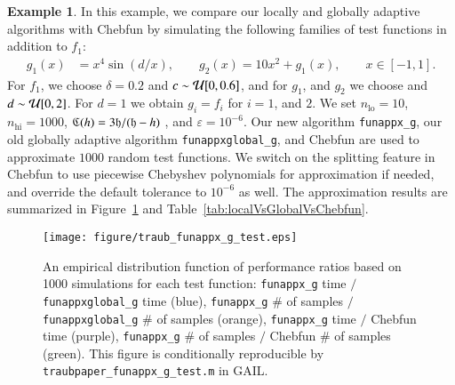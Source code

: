 \documentclass[review]{elsarticle}
\newcommand{\abstol}{\varepsilon}
\theoremstyle{definition}
\newtheorem{exmp}{Example}
\newcommand{\funappxg}{\texttt{funappx\_g}\xspace}
\newcommand{\funappxglobalg}{\texttt{funappxglobal\_g}\xspace}
\begin{document}

\begin{exmp}
In this example, we compare our locally and globally adaptive algorithms with Chebfun by
simulating the following families of test functions  in addition to $f_1$:
%
\begin{align*}
 g_1(x) &= x^4 \sin(d/x), \qquad
 g_2(x) = 10  x^2 + g_1(x), \qquad x \in [-1, 1].
\end{align*}
For $f_1$, we choose $\delta = 0.2$ and $c \sim \mathcal{U}[0,0.6]$, and for $g_1$, and
$g_2$ we choose and $d \sim \mathcal{U}[0,2]$. For $d=1$ we obtain $g_i = f_i$ for
$i=1$, and $2$. We set $n_{\text{lo}} = 10$, $n_{\text{hi}} = 1000$, $\mathfrak{C} (h) =
3 \mathfrak{h}/(\mathfrak{h}-h)$ , and $\abstol = 10^{-6}$. Our new algorithm \texttt{funappx\_g},
our old globally adaptive algorithm \texttt{funappxglobal\_g}, and Chebfun are
used to approximate $1000$ random test functions. We switch on the splitting
feature in Chebfun to use piecewise Chebyshev polynomials for approximation if
needed, and override the default tolerance to $10^{-6}$ as well. The
approximation results are summarized in Figure~\ref{fig:testfunctions} and
Table~\ref{tab:localVsGlobalVsChebfun}.

%
\begin{figure}[tb]
  \centering
\texttt{[image: figure/traub\_funappx\_g\_test.eps]}
\caption{An empirical distribution function of performance ratios based on 1000
simulations for each test function: \funappxg{} time $/$ \funappxglobalg{} time
(blue), \funappxg{} \# of samples $/$ \funappxglobalg{} \# of samples (orange),
\funappxg{} time $/$ Chebfun time (purple), \funappxg{} \# of samples $/$
Chebfun \# of samples (green). This figure is conditionally reproducible by
\texttt{traubpaper\_funappx\_g\_test.m} in GAIL.}
\label{fig:testfunctions}
\end{figure}


\end{exmp}
\end{document}
